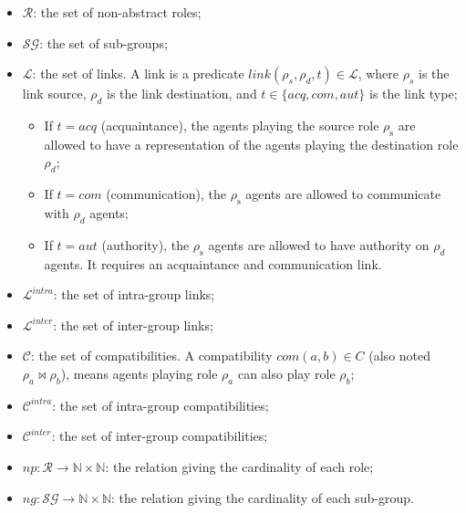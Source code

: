 \documentclass[runningheads]{llncs}
\newcounter{relation}
\begin{document}
\begin{itemize}
    \item $\mathcal{R}$: the set of non-abstract roles;
          
    \item $\mathcal{SG}$: the set of sub-groups;
          
    \item $\mathcal{L}$: the set of links. A link is a predicate $link(\rho_s,\rho_d,t) \in \mathcal{L}$, where $\rho_{s}$ is the link source, $\rho_{d}$ is the link destination, and $t \in\{acq, com, aut\}$ is the link type;
          \begin{itemize}
              \item If $t = acq$ (acquaintance), the agents playing the source role $\rho_{\mathrm{s}}$ are allowed to have a representation of the agents playing the destination role $\rho_{d}$;
              \item If $t = com$ (communication), the $\rho_{\mathrm{s}}$ agents are allowed to communicate with $\rho_{d}$ agents;
              \item If $t = aut$ (authority), the $\rho_{\mathrm{s}}$ agents are allowed to have authority on $\rho_{d}$ agents. It requires an acquaintance and communication link.
          \end{itemize}
    \item $\mathcal{L}^{intra}$: the set of intra-group links;
    \item $\mathcal{L}^{inter}$: the set of inter-group links;
          
    \item $\mathcal{C}$: the set of compatibilities. A compatibility $com(a,b) \in C$ (also noted $\rho_a \bowtie \rho_b$), means agents playing role $\rho_a$ can also play role $\rho_b$;
    \item $\mathcal{C}^{intra}$: the set of intra-group compatibilities;
    \item $\mathcal{C}^{inter}$: the set of inter-group compatibilities;
          
    \item $np: \mathcal{R} \rightarrow \mathbb{N} \times \mathbb{N}$: the relation giving the cardinality of each role;
    \item $ng: \mathcal{SG} \rightarrow \mathbb{N} \times \mathbb{N}$: the relation giving the cardinality of each sub-group.
          
\end{itemize}
\end{document}
